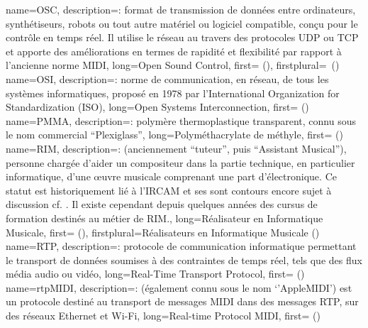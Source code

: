 {
    name={OSC},
    description={\textit{}: format de transmission de données entre ordinateurs, synthétiseurs, robots ou tout autre matériel ou logiciel compatible, conçu pour le contrôle en temps réel. Il utilise le réseau au travers des protocoles \gls{UDP} ou \gls{TCP} et apporte des améliorations en termes de rapidité et flexibilité par rapport à l'ancienne norme MIDI},
    long={Open Sound Control},
    first={ ()},
    firstplural={\glspluralsuffix\ (\glspluralsuffix)}
}
{
    name={OSI},
    description={\textit{}: norme de communication, en réseau, de tous les systèmes informatiques, proposé en 1978 par l'International Organization for Standardization (ISO)},
    long={Open Systems Interconnection},
    first={ ()}
}
{
    name={PMMA},
    description={\textit{}: polymère thermoplastique transparent, connu sous le nom commercial ``Plexiglass''},
    long={Polyméthacrylate de méthyle},
    first={ ()}
}
{
    name={RIM},
    description={\textit{}: (anciennement ``tuteur'', puis ``Assistant Musical''), personne chargée d'aider un compositeur dans la partie technique, en particulier informatique, d'une œuvre musicale comprenant une part d'électronique. Ce statut est historiquement lié à l'\gls{IRCAM} et ses sont contours encore sujet à discussion cf. \cite{zattra_les_2013}. Il existe cependant depuis quelques années des cursus de formation destinés au métier de RIM.},
    long={Réalisateur en Informatique Musicale},
    first={ ()},
    firstplural={Réalisateurs en Informatique Musicale (\glspluralsuffix)}
}
{
    name={RTP},
    description={\textit{}: protocole de communication informatique permettant le transport de données soumises à des contraintes de temps réel, tels que des flux média audio ou vidéo},
    long={Real-Time Transport Protocol},
    first={ ()}
}
{
    name={rtpMIDI},
    description={\textit{}: (également connu sous le nom `'AppleMIDI') est un protocole destiné au transport de messages MIDI dans des messages \gls{RTP}, sur des réseaux Ethernet et Wi-Fi},
    long={Real-time Protocol MIDI},
    first={ ()}
}

